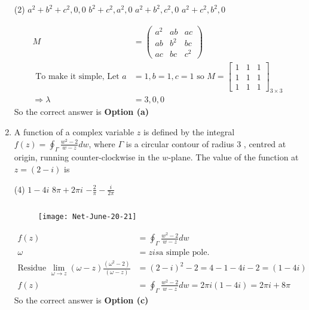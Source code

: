 \begin{enumerate}
 \begin{tasks}(2)
	\task[\textbf{a.}]$a^{2}+b^{2}+c^{2}, 0,0$
	\task[\textbf{b.}]$b^{2}+c^{2}, a^{2}, 0$
	\task[\textbf{c.}]$a^{2}+b^{2}, c^{2}, 0$
	\task[\textbf{d.}]$a^{2}+c^{2}, b^{2}, 0$	 
\end{tasks}
\begin{answer}
	\begin{align*}
	M&=\left(\begin{array}{lll}
	a^{2} & a b & a c \\
	a b & b^{2} & b c \\
	a c & b c & c^{2}
	\end{array}\right)\\
\text{	To make it simple, Let }a&=1, b=1, c=1\text{ so }
	M=\left[\begin{array}{lll}
	1 & 1 & 1 \\
	1 & 1 & 1 \\
	1 & 1 & 1
	\end{array}\right]_{3 \times 3}\\
	\Rightarrow \lambda&=3,0,0
	\end{align*}
		So the correct answer is \textbf{Option (a)}
\end{answer}
\item  A function of a complex variable $z$ is defined by the integral $f(z)=\oint_{\Gamma} \frac{w^{2}-2}{w-z} d w$, where $\Gamma$ is a circular contour of radius 3 , centred at origin, running counter-clockwise in the $w$-plane. The value of the function at $z=(2-i)$ is
 \begin{tasks}(4)
	\task[\textbf{b.}]$1-4 i$
	\task[\textbf{c.}]$8 \pi+2 \pi i$
	\task[\textbf{d.}]$-\frac{2}{\pi}-\frac{i}{2 \pi}$ 
\end{tasks}	
\begin{answer}$\left. \right. $
		\begin{figure}[H]
		\centering
		\texttt{[image: Net-June-20-21]}
	\end{figure}
	\begin{align*}
	 f(z)&=\oint_{\Gamma} \frac{w^{2}-2}{w-z} d w \\
	 \omega&=z is \text{a simple pole.}\\
	\text{Residue }\lim _{\omega \rightarrow z}(\omega-z) \frac{\left(\omega^{2}-2\right)}{(\omega-z)}&=(2-i)^{2}-2=4-1-4 i-2=(1-4 i)\\
	f(z)&=\oint_{\Gamma} \frac{w^{2}-2}{w-z} d w=2 \pi i(1-4 i)=2 \pi i+8 \pi
	\end{align*}
	So the correct answer is \textbf{Option (c)}

\end{answer}
\end{enumerate}
